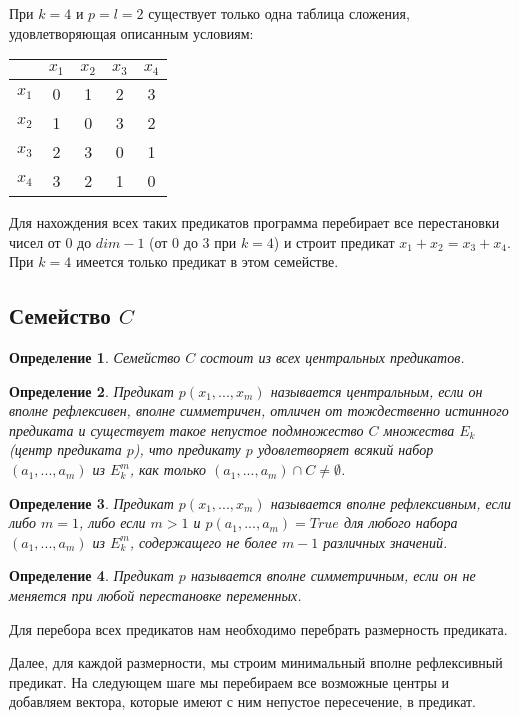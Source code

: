\documentclass[a4paper,14pt]{extreport}
\newtheorem{opr}{Определение}
\begin{document}
При $k=4$ и $p=l=2$ существует только одна таблица сложения, удовлетворяющая описанным условиям: 
\begin{center}
\begin{tabular}{|c|c|c|c|c|}
\hline
&$x_1$&$x_2$&$x_3$&$x_4$\\
\hline
$x_1$&0&1&2&3\\
\hline
$x_2$&1&0&3&2\\
\hline
$x_3$&2&3&0&1\\
\hline
$x_4$&3&2&1&0\\
\hline
\end{tabular}
\end{center}

Для нахождения всех таких предикатов программа перебирает все перестановки чисел от $0$ до $dim-1$ (от $0$ до $3$ при $k=4$) и строит предикат $x_1+x_2=x_3+x_4$. При $k=4$ имеется только предикат в этом семействе.
\subsection{Семейство $C$}
\begin{opr}
Семейство $C$ состоит из всех центральных предикатов.
\end{opr}

\begin{opr} Предикат $p(x_1,...,x_m )$ называется центральным, если он вполне рефлексивен, вполне симметричен, отличен от тождественно истинного предиката и существует такое непустое подмножество $C$ множества $E_k$ (центр предиката $p$),  что предикату $p$ удовлетворяет всякий набор $(a_1,..., a_m)$ из $E_k^m$, как только $(a_1,..., a_m) \cap C \neq \emptyset$.
\end{opr}
\begin{opr}Предикат $p(x_1,..., x_m)$ называется вполне рефлексивным, если либо $m = 1$, либо  если $m > 1$ и $p(a_1,..., a_m) = True$ для любого набора $(a_1,...,a_m)$ из $E_k^m$, содержащего не более $m-1$ различных значений.
\end{opr}
\begin{opr} 
Предикат $p$ называется вполне симметричным, если он не меняется при любой перестановке переменных.  
\end{opr}

Для перебора всех предикатов нам необходимо перебрать размерность предиката.

Далее, для каждой размерности, мы строим минимальный вполне рефлексивный предикат.
На следующем шаге мы перебираем все возможные центры и добавляем вектора, которые имеют с ним непустое пересечение, в предикат.
\end{document}
